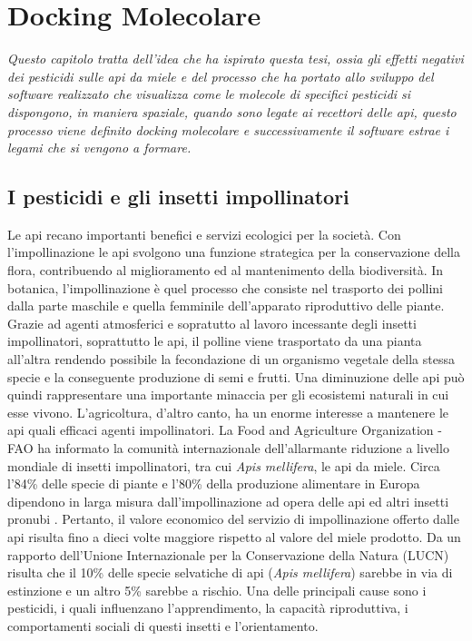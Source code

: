 \chapter{Docking Molecolare}
\textit{Questo capitolo tratta dell'idea che ha ispirato questa tesi, ossia gli effetti negativi dei pesticidi sulle api da miele e del processo che ha portato allo sviluppo del software realizzato che visualizza come le molecole di specifici pesticidi si dispongono, in maniera spaziale, quando sono legate ai recettori delle api, questo processo viene definito docking molecolare e successivamente il software estrae i legami che si vengono a formare.}

\vskip 1cm

\section{I pesticidi e gli insetti impollinatori}
Le api recano importanti benefici e servizi ecologici per la società. Con l’impollinazione le api svolgono una funzione strategica per la conservazione della flora, contribuendo al miglioramento ed al mantenimento della biodiversità.\newline
In botanica, l’impollinazione è quel processo che consiste nel trasporto dei pollini dalla parte maschile e quella femminile dell’apparato riproduttivo delle piante. Grazie ad agenti atmosferici e sopratutto al lavoro incessante degli insetti impollinatori, soprattutto le api, il polline viene trasportato da una pianta all’altra rendendo possibile la fecondazione di un organismo vegetale della stessa specie e la conseguente produzione di semi e frutti. Una diminuzione delle api può quindi rappresentare una importante minaccia per gli ecosistemi naturali in cui esse vivono. L’agricoltura, d’altro canto, ha un enorme interesse a mantenere le api quali efficaci agenti impollinatori. La Food and Agriculture Organization - FAO ha informato la comunità internazionale dell’allarmante riduzione a livello mondiale di insetti impollinatori, tra cui \textit{Apis mellifera}, le api da miele. Circa l’84\% delle specie di piante e l’80\% della produzione alimentare in Europa dipendono in larga misura dall’impollinazione ad opera delle api ed altri insetti pronubi \cite{bellucciapi}. Pertanto, il valore economico del servizio di impollinazione offerto dalle api risulta fino a dieci volte maggiore rispetto al valore del miele prodotto.\newline 
Da un rapporto dell’Unione Internazionale per la Conservazione della Natura (LUCN) risulta che il 10\% delle specie selvatiche di api (\textit{Apis mellifera}) sarebbe in via di estinzione e un altro 5\% sarebbe a rischio. Una delle principali cause sono i pesticidi, i quali influenzano l’apprendimento, la capacità riproduttiva, i comportamenti sociali di questi insetti e l'orientamento. \newline
